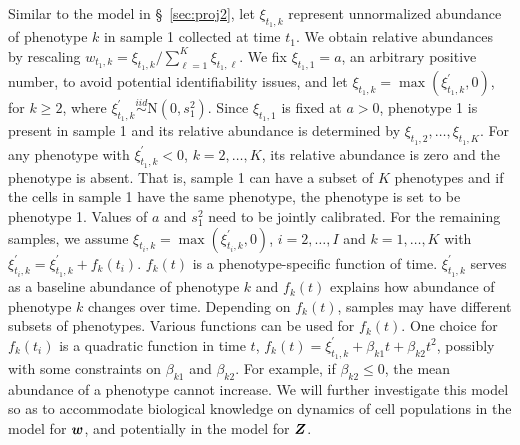 \documentclass[12pt,]{article}
\newcommand{\N}{ \mathcal{N} }
\newcommand{\iid}{\overset{iid}{\sim}}
\def\N{\text{N}}
\newcommand{\bZ}{\mbox{\boldmath $Z$}}
\newcommand{\bw}{\mbox{\boldmath $w$}}
\begin{document}
Similar to the model in \S~\ref{sec:proj2}, let $\xi_{t_1,k}$ represent
unnormalized abundance of phenotype $k$ in sample 1 collected at time $t_1$.
We obtain relative abundances by rescaling $w_{t_1,k}=
\xi_{t_1,k}/\sum_{\ell=1}^K \xi_{t_1, \ell}$.  We fix $\xi_{t_1,1}=a$, an
arbitrary positive number, to avoid potential identifiability issues, and let
$\xi_{t_1,k} = \max(\xi^\prime_{t_1,k}, 0)$, for $k\ge 2$, where
$\xi^\prime_{t_1,k} \iid \N(0, s^2_1)$.  Since $\xi_{t_1, 1}$ is fixed at
$a>0$, phenotype 1 is present in sample 1 and its relative abundance is
determined by $\xi_{t_1, 2}, \ldots, \xi_{t_1, K}$.  For any phenotype with
$\xi^\prime_{t_1, k} < 0$, $k=2, \ldots, K$, its relative abundance is zero and
the phenotype is absent.  That is, sample 1 can have a subset of $K$ phenotypes
and if the cells in sample 1 have the same phenotype, the phenotype is set to be
phenotype 1. Values of $a$ and $s^2_1$ need to be jointly calibrated. For the
remaining samples, we assume $\xi_{t_i,k} = \max(\xi^\prime_{t_i,k}, 0)$, $i=2,
\ldots, I$ and $k=1, \ldots, K$ with $\xi^\prime_{t_i,k} = \xi^\prime_{t_1, k}
+ f_k(t_i)$. $f_k(t)$ is a phenotype-specific function of time.
$\xi^\prime_{t_1, k}$ serves as a baseline abundance of phenotype $k$ and
$f_k(t)$ explains how abundance of phenotype $k$ changes over time.
Depending on $f_k(t)$, samples may have different subsets of phenotypes.
Various functions can be used for $f_k(t)$.  One choice for $f_k(t_i)$ is a
quadratic function in time $t$, $f_k(t) = \xi^\prime_{t_1,k} + \beta_{k1}t +
\beta_{k2}t^2$, possibly with some constraints on $\beta_{k1}$ and
$\beta_{k2}$.  For example, if $\beta_{k2} \leq 0$, the mean abundance of a
phenotype cannot increase.  We will further investigate this model so as to
accommodate biological knowledge on dynamics of cell populations in the model
for $\bw$, and potentially in the model for $\bZ$.   

\end{document}
